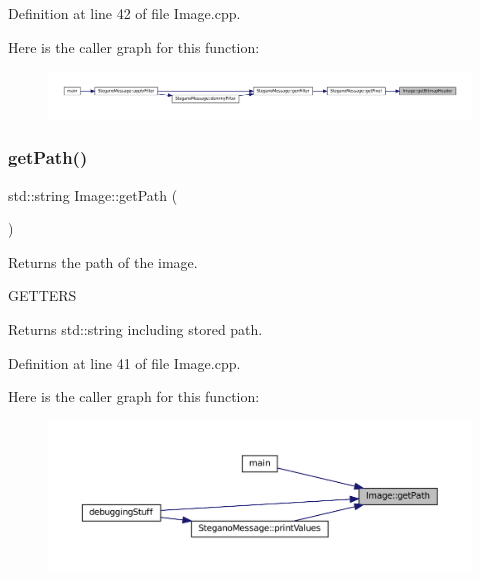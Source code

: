 Definition at line 42 of file Image.\+cpp.

Here is the caller graph for this function\+:\nopagebreak
\begin{figure}[H]
\begin{center}
\leavevmode
\includegraphics[width=350pt]{classImage_a8c824ffac0c866a94752a2c1047932af_icgraph}
\end{center}
\end{figure}
\mbox{\label{classImage_a885989eb723cb0a1fc0555c7e8de817e}} 
\subsubsection{\texorpdfstring{getPath()}{getPath()}}
{\footnotesize\ttfamily std\+::string Image\+::get\+Path (\begin{DoxyParamCaption}{ }\end{DoxyParamCaption})}



Returns the path of the image. 

G\+E\+T\+T\+E\+RS\begin{DoxyReturn}{Returns}
std\+::string including stored path. 
\end{DoxyReturn}


Definition at line 41 of file Image.\+cpp.

Here is the caller graph for this function\+:\nopagebreak
\begin{figure}[H]
\begin{center}
\leavevmode
\includegraphics[width=350pt]{classImage_a885989eb723cb0a1fc0555c7e8de817e_icgraph}
\end{center}
\end{figure}
\mbox{\label{classImage_ac4e8db14cfd60a6a7085e6fcb83488a4}} 
